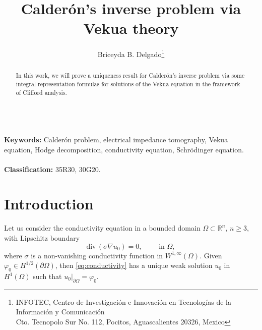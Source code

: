 \documentclass[12pt]{article}
\def\div{\mbox{div}\,}
\newcommand{\JLb}[1]{\textcolor{blue}{#1}}
\begin{document}
 
\title{Calderón's inverse problem via Vekua theory}
\author{Briceyda B. Delgado\thanks{INFOTEC, Centro de Investigación e Innovación en Tecnologías de la Información y Comunicación
\\Cto. Tecnopolo Sur No. 112, Pocitos, Aguascalientes 20326, Mexico}}
\date{}
\maketitle
\begin{abstract}
In this work, we will prove a uniqueness result for Calderón's inverse problem via some integral representation formulas for solutions of the Vekua equation in the framework of Clifford analysis.
\end{abstract}
\mbox{}\\
\noindent \textbf{Keywords:} Calderón problem, electrical impedance tomography, Vekua equation, Hodge decomposition, conductivity equation, Schrödinger equation.\\ 
\mbox{}\\
\noindent \textbf{Classification:} 35R30, 30G20. 



\section{Introduction}
Let us consider the conductivity equation in a bounded domain $\Omega\subset \mathbb{R}^n$, $n\geq 3$, with Lipschitz boundary
\begin{equation}\label{eq:conductivity}
  \div \left(\sigma \nabla u_0\right)=0, \qquad \text{ in }\Omega, 
\end{equation}
where $\sigma$ is a non-vanishing conductivity function in $W^{1,\infty}(\Omega)$. Given $\varphi_0\in H^{1/2}(\partial\Omega)$, then \eqref{eq:conductivity} has a unique weak solution $u_0$ in $H^1(\Omega)$ such that $u_0|_{\partial\Omega}=\varphi_0$.
\end{document}
